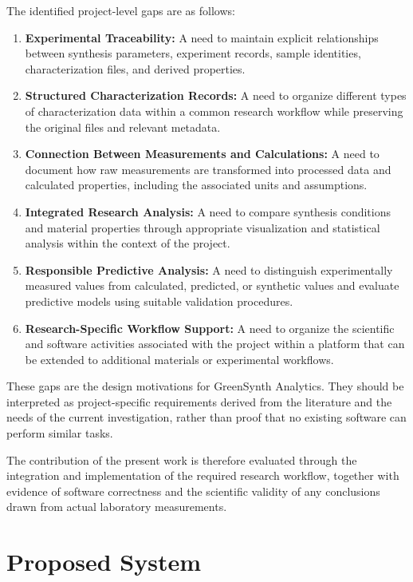 \documentclass[12pt,a4paper,oneside]{report}
\begin{document}
{{{The identified project-level gaps are as follows:

\begin{enumerate}
    \item \textbf{Experimental Traceability:} A need to maintain explicit relationships between synthesis parameters, experiment records, sample identities, characterization files, and derived properties.
    \item \textbf{Structured Characterization Records:} A need to organize different types of characterization data within a common research workflow while preserving the original files and relevant metadata.
    \item \textbf{Connection Between Measurements and Calculations:} A need to document how raw measurements are transformed into processed data and calculated properties, including the associated units and assumptions.
    \item \textbf{Integrated Research Analysis:} A need to compare synthesis conditions and material properties through appropriate visualization and statistical analysis within the context of the project.
    \item \textbf{Responsible Predictive Analysis:} A need to distinguish experimentally measured values from calculated, predicted, or synthetic values and evaluate predictive models using suitable validation procedures.
    \item \textbf{Research-Specific Workflow Support:} A need to organize the scientific and software activities associated with the project within a platform that can be extended to additional materials or experimental workflows.
\end{enumerate}

These gaps are the design motivations for GreenSynth Analytics. They should be interpreted as project-specific requirements derived from the literature and the needs of the current investigation, rather than proof that no existing software can perform similar tasks.

The contribution of the present work is therefore evaluated through the integration and implementation of the required research workflow, together with evidence of software correctness and the scientific validity of any conclusions drawn from actual laboratory measurements.

\section{Proposed System}

}}}
\end{document}
